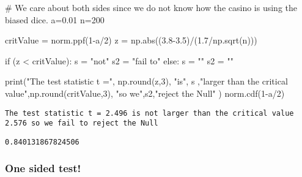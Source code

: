\documentclass[
  letterpaper,
  DIV=11,
  numbers=noendperiod]{scrreprt}
\newenvironment{Shaded}{\begin{snugshade}}{\end{snugshade}}
\newcommand{\BuiltInTok}[1]{\textcolor[rgb]{0.00,0.23,0.31}{#1}}
\newcommand{\CommentTok}[1]{\textcolor[rgb]{0.37,0.37,0.37}{#1}}
\newcommand{\ControlFlowTok}[1]{\textcolor[rgb]{0.00,0.23,0.31}{#1}}
\newcommand{\DecValTok}[1]{\textcolor[rgb]{0.68,0.00,0.00}{#1}}
\newcommand{\FloatTok}[1]{\textcolor[rgb]{0.68,0.00,0.00}{#1}}
\newcommand{\NormalTok}[1]{\textcolor[rgb]{0.00,0.23,0.31}{#1}}
\newcommand{\OperatorTok}[1]{\textcolor[rgb]{0.37,0.37,0.37}{#1}}
\newcommand{\StringTok}[1]{\textcolor[rgb]{0.13,0.47,0.30}{#1}}
\begin{document}
\begin{Shaded}
\begin{Highlighting}[]
\CommentTok{\# We care about both sides since we do not know how the casino is using the biased dice.}
\NormalTok{a}\OperatorTok{=}\FloatTok{0.01}
\NormalTok{n}\OperatorTok{=}\DecValTok{200}

\NormalTok{critValue }\OperatorTok{=}\NormalTok{ norm.ppf(}\DecValTok{1}\OperatorTok{{-}}\NormalTok{a}\OperatorTok{/}\DecValTok{2}\NormalTok{)}
\NormalTok{z }\OperatorTok{=}\NormalTok{ np.}\BuiltInTok{abs}\NormalTok{((}\FloatTok{3.8}\OperatorTok{{-}}\FloatTok{3.5}\NormalTok{)}\OperatorTok{/}\NormalTok{(}\FloatTok{1.7}\OperatorTok{/}\NormalTok{np.sqrt(n))) }

\ControlFlowTok{if}\NormalTok{ (z }\OperatorTok{\textless{}}\NormalTok{ critValue):}
\NormalTok{    s }\OperatorTok{=} \StringTok{"not"}
\NormalTok{    s2 }\OperatorTok{=} \StringTok{"fail to"}
\ControlFlowTok{else}\NormalTok{:}
\NormalTok{    s }\OperatorTok{=} \StringTok{""}   
\NormalTok{    s2 }\OperatorTok{=} \StringTok{""}
    
\BuiltInTok{print}\NormalTok{(}\StringTok{"The test statistic t ="}\NormalTok{, np.}\BuiltInTok{round}\NormalTok{(z,}\DecValTok{3}\NormalTok{), }\StringTok{"is"}\NormalTok{, s ,}\StringTok{"larger than the critical value"}\NormalTok{,np.}\BuiltInTok{round}\NormalTok{(critValue,}\DecValTok{3}\NormalTok{), }\StringTok{"so we"}\NormalTok{,s2,}\StringTok{"reject the Null"}\NormalTok{ ) }
\NormalTok{norm.cdf(}\DecValTok{1}\OperatorTok{{-}}\NormalTok{a}\OperatorTok{/}\DecValTok{2}\NormalTok{)}
\end{Highlighting}
\end{Shaded}

\begin{verbatim}
The test statistic t = 2.496 is not larger than the critical value 2.576 so we fail to reject the Null
\end{verbatim}

\begin{verbatim}
0.840131867824506
\end{verbatim}

\hypertarget{one-sided-test}{%
\subsubsection{One sided test!}\label{one-sided-test}}
\end{document}
